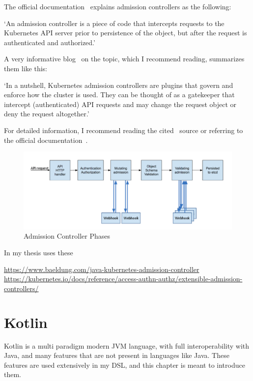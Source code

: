 The official documentation~\cite{K8sAdmissionOfficial} explains admission controllers as the following:

`An admission controller is a piece of code that intercepts requests to the Kubernetes API server prior to persistence of the object, but after the request is authenticated and authorized.'

A very informative blog~\cite{K8sAdmissionBlog} on the topic, which I recommend reading, summarizes them like this:

`In a nutshell, Kubernetes admission controllers are plugins that govern and enforce how the cluster is used. They can be thought of as a gatekeeper that intercept (authenticated) API requests and may change the request object or deny the request altogether.' 

For detailed information, I recommend reading the cited~\cite{K8sAdmissionBlog} source or referring to the official documentation~\cite{K8sAdmissionOfficial}.

\begin{figure}[h]
    \centering
    \includegraphics[width=130mm, keepaspectratio]{content/10_prerequisites/dynadm.png}
    \caption{Admission Controller Phases~\cite{K8sAdmissionBlog}}
    \label{fig:dynadm}
\end{figure}

In my thesis uses these 

\url{https://www.baeldung.com/java-kubernetes-admission-controller}
\url{https://kubernetes.io/docs/reference/access-authn-authz/extensible-admission-controllers/}



\section{Kotlin}

Kotlin is a multi paradigm modern JVM language, with full interoperability with Java, and many features that are not present in languages like Java. These features are used extensively in my DSL, and this chapter is meant to introduce them.

